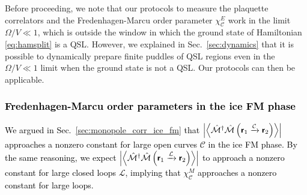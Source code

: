 \documentclass[twocolumn,superscriptaddress,amsmath,amssymb,aps,prx,nofootinbib]{revtex4-2}
\newcommand{\dual}[1]{\boldsymbol{\mathsf{#1}}}
\newcommand{\newtext}[1]{\textcolor{black}{#1}}
\begin{document}
Before proceeding, we note that our protocols to measure the plaquette correlators and the Fredenhagen-Marcu order parameter $\chi_\mathcal{C}^E$ work in the limit $\Omega/V \ll 1$, which is outside the window in which the ground state of Hamiltonian \eqref{eq:hamsplit} is a QSL. However, we explained in Sec.~\ref{sec:dynamics} that it is possible to dynamically prepare finite puddles of QSL regions even in the $\Omega /V \ll 1$ limit when the ground state is not a QSL. Our protocols can then be applicable. 

\newtext{\subsubsection{Fredenhagen-Marcu order parameters in the ice FM phase}}
\label{sec:FM_ice_fm}

\newtext{We argued in Sec.~\ref{sec:monopole_corr_ice_fm} that $\abs{ \expval{ \hat{\mathcal{M}}^\dagger \hat{\mathcal{M}} \left(\dual{r}_1 \xrightarrow{\mathcal{C}} \dual{r}_2 \right)} }$ approaches a nonzero constant for large open curves $\mathcal{C}$ in the ice FM phase. By the same reasoning, we expect  $\abs{ \expval{ \hat{\mathcal{M}}^\dagger \hat{\mathcal{M}} \left(\dual{r}_1 \xrightarrow{\mathcal{L}} \dual{r}_2 \right) } }$ to approach a nonzero constant for large closed loops $\mathcal{L}$, implying that $\chi_\mathcal{C}^M$ approaches a nonzero constant for large loops.} 
\end{document}
